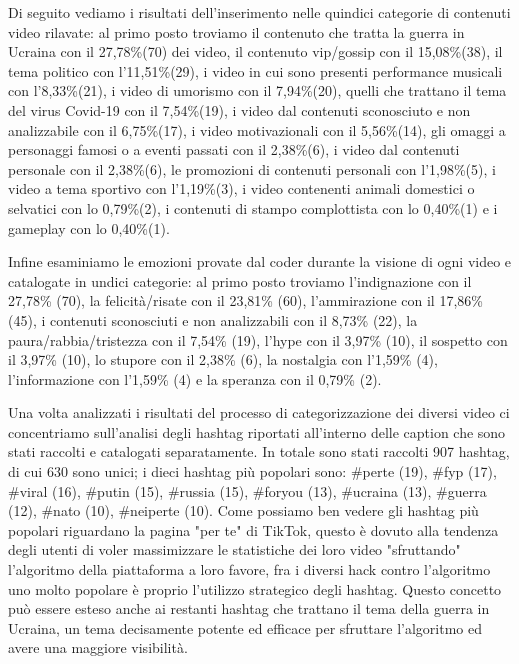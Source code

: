 Di seguito vediamo i risultati dell'inserimento nelle quindici categorie di contenuti video rilavate: al primo posto troviamo 
il contenuto che tratta la guerra in Ucraina con il 27,78\%(70) dei video, il contenuto vip/gossip con il 15,08\%(38), 
il tema politico con l'11,51\%(29), i video in cui sono presenti performance musicali con l'8,33\%(21), i video di umorismo con 
il 7,94\%(20), quelli che trattano il tema del virus Covid-19 con il 7,54\%(19), i video dal contenuti sconosciuto e non analizzabile 
con il 6,75\%(17), i video motivazionali con il 5,56\%(14), gli omaggi a personaggi famosi o a eventi passati con il 2,38\%(6), 
i video dal contenuti personale con il 2,38\%(6), le promozioni di contenuti personali con l'1,98\%(5), i video a tema sportivo 
con l'1,19\%(3), i video contenenti animali domestici o selvatici con lo 0,79\%(2), i contenuti di stampo complottista con lo 
0,40\%(1) e i gameplay con lo 0,40\%(1).

Infine esaminiamo le emozioni provate dal coder durante la visione di ogni video e catalogate in undici categorie: al primo posto 
troviamo l'indignazione con il 27,78\% (70), la felicità/risate con il 23,81\% (60), l'ammirazione con il 17,86\% (45), i contenuti 
sconosciuti e non analizzabili con il 8,73\% (22), la paura/rabbia/tristezza con il 7,54\% (19), l'hype con il 3,97\% (10), 
il sospetto con il 3,97\% (10), lo stupore con il 2,38\% (6), la nostalgia con l'1,59\% (4), l'informazione con l'1,59\% (4) e 
la speranza con il 0,79\% (2).

Una volta analizzati i risultati del processo di categorizzazione dei diversi video ci concentriamo sull'analisi degli hashtag riportati
all'interno delle caption che sono stati raccolti e catalogati separatamente. In totale sono stati raccolti 907 hashtag, di cui 630 
sono unici; i dieci hashtag più popolari sono: \#perte (19), \#fyp (17), \#viral (16), \#putin (15), \#russia (15), \#foryou (13), 
\#ucraina (13), \#guerra (12), \#nato (10), \#neiperte (10). 
Come possiamo ben vedere gli hashtag più popolari riguardano la pagina "per te" di TikTok, questo è dovuto alla tendenza degli utenti 
di voler massimizzare le statistiche dei loro video "sfruttando" l'algoritmo della piattaforma a loro favore, fra i diversi hack 
contro l'algoritmo uno molto popolare è proprio l'utilizzo strategico degli hashtag.
Questo concetto può essere esteso anche ai restanti hashtag che trattano il tema della guerra in Ucraina, un tema decisamente potente 
ed efficace per sfruttare l'algoritmo ed avere una maggiore visibilità.

